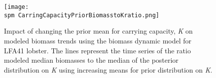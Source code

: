 \documentclass[11pt]{article}
\newcommand{\D}{.}
\newcommand{\spm}{/backup/bio_data/bio.lobster/spmodelling/lfa41/}
\begin{document}
\begin{landscape}
\begin{figure}
        
\end{figure}

%

\end{landscape}
     \clearpage

\begin{figure}
\centering
\texttt{[image: \\spm CarringCapacityPriorBiomasstoKratio.png]}
\caption{Impact of changing the prior mean for carrying capacity, \emph{K} on modeled biomass trends using the biomass dynamic model for LFA41 lobster. The lines represent the time series of the ratio modeled median biomasses to the median of the posterior distribution on \emph{K} using increasing means for prior distribution on \emph{K}. }

\end{figure}
     \clearpage
\end{document}
